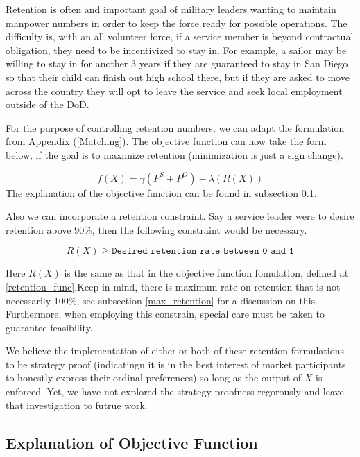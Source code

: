 Retention is often and important goal of military leaders wanting to maintain manpower numbers in order to keep the force ready for possible operations. The difficulty is, with an all volunteer force, if a service member is beyond contractual obligation, they need to be incentivized to stay in. For example, a sailor may be willing to stay in for another 3 years if they are guaranteed to stay in San Diego so that their child can finish out high school there, but if they are asked to move across the country they will opt to leave the service and seek local employment outside of the DoD. 

For the purpose of controlling retention numbers, we can adapt the formulation from Appendix (\ref{Matching}). The objective function can now take the form below, if the goal is to maximize retention (minimization is just a sign change).

\[ f(X) = \gamma(P^S + P^O) - \lambda (R(X)) \]
The explanation of the objective function can be found in subsection \ref{retention_obj}.

Also we can incorporate a retention constraint. Say a service leader were to desire retention above 90\%, then the following constraint would be necessary. 

\[R(X) \geq \texttt{Desired retention rate between 0 and 1} \]

Here $R(X)$ is the same as that in the objective function fomulation, defined at \ref{retention_func}.Keep in mind, there is maximum rate on retention that is not necessarily 100\%, see subsection \ref{max_retention} for a discussion on this. Furthermore, when employing this constrain, special care must be taken to guarantee feasibility.  

We believe the implementation of either or both of these retention formulations to be strategy proof (indicatingn it is in the best interest of market participants to honestly express their ordinal preferences) so long as the output of $X$ is enforced. Yet, we have not explored the strategy proofness regorously and leave that investigation to futrue work.

\subsection{Explanation of Objective Function}
\label{retention_obj}

